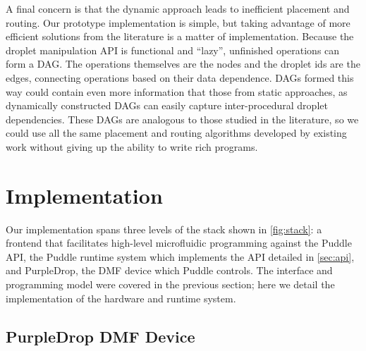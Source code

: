 \documentclass[sigconf, screen]{acmart}
\newcommand\pavel[1]{\todo[color=blue!60]{\sf #1}}
\begin{document}
A final concern is that the dynamic approach leads to inefficient placement and routing.
Our prototype implementation is simple, but taking advantage of more efficient solutions from the literature \cite{bohringer2006parallel, grissom2012scheduling, keszocze2015routing, roy2010routing}
is a matter of implementation.
Because the droplet manipulation API is functional and ``lazy'', unfinished operations can form a DAG.
The operations themselves are the nodes and the droplet ids are the edges, connecting operations based on their data dependence.
DAGs formed this way could contain even more information that those from static approaches, as dynamically constructed DAGs can easily capture inter-procedural droplet dependencies.
These DAGs are analogous to those studied in the literature, so
we could use all the same placement and routing algorithms developed by existing work without giving up the ability to write rich programs.

\section{Implementation}
\label{sec:impl}

Our implementation spans three levels of the stack shown in \autoref{fig:stack}: a frontend that facilitates high-level microfluidic programming against the Puddle API, the Puddle runtime system which implements the API detailed in \autoref{sec:api}, and PurpleDrop, the DMF device which Puddle controls.
The interface and programming model were covered in the previous section; here we detail the implementation of the hardware and runtime system.
\pavel{reorder to go top-down}



\subsection{PurpleDrop DMF Device}
\end{document}
